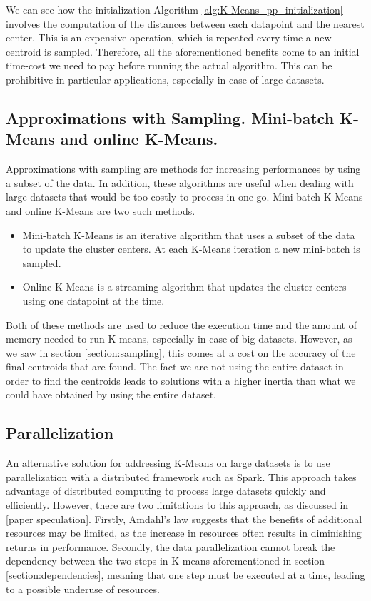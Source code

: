 We can see how the initialization Algorithm \ref{alg:K-Means_pp_initialization} involves the computation of the distances between each datapoint and the nearest center. This is an expensive operation, which is repeated every time a new centroid is sampled. Therefore, all the aforementioned benefits come to an initial time-cost we need to pay before running the actual algorithm. This can be prohibitive in particular applications, especially in case of large datasets.

\subsection{Approximations with Sampling. Mini-batch K-Means and online K-Means.}
\label{section:approximation}
Approximations with sampling are methods for increasing performances by using a subset of the data. In addition, these algorithms are useful when dealing with large datasets that would be too costly to process in one go. 
Mini-batch K-Means and online K-Means are two such methods. 
\begin{itemize}
    \item Mini-batch K-Means is an iterative algorithm that uses a subset of the data to update the cluster centers. At each K-Means iteration a new mini-batch is sampled.
    \item Online K-Means is a streaming algorithm that updates the cluster centers using one datapoint at the time.
\end{itemize}
Both of these methods are used to reduce the execution time and the amount of memory needed to run K-means, especially in case of big datasets. However, as we saw in section \ref{section:sampling}, this comes at a cost on the accuracy of the final centroids that are found. The fact we are not using the entire dataset in order to find the centroids leads to solutions with a higher inertia than what we could have obtained by using the entire dataset.

\subsection{Parallelization}
\label{section:parallelization}
An alternative solution for addressing K-Means on large datasets is to use parallelization with a distributed framework such as Spark. This approach takes advantage of distributed computing to process large datasets quickly and efficiently. However, there are two limitations to this approach, as discussed in [paper speculation]. Firstly, Amdahl's law suggests that the benefits of additional resources may be limited, as the increase in resources often results in diminishing returns in performance. Secondly, the data parallelization cannot break the dependency between the two steps in K-means aforementioned in section \ref{section:dependencies}, meaning that one step must be executed at a time, leading to a possible underuse of resources.

